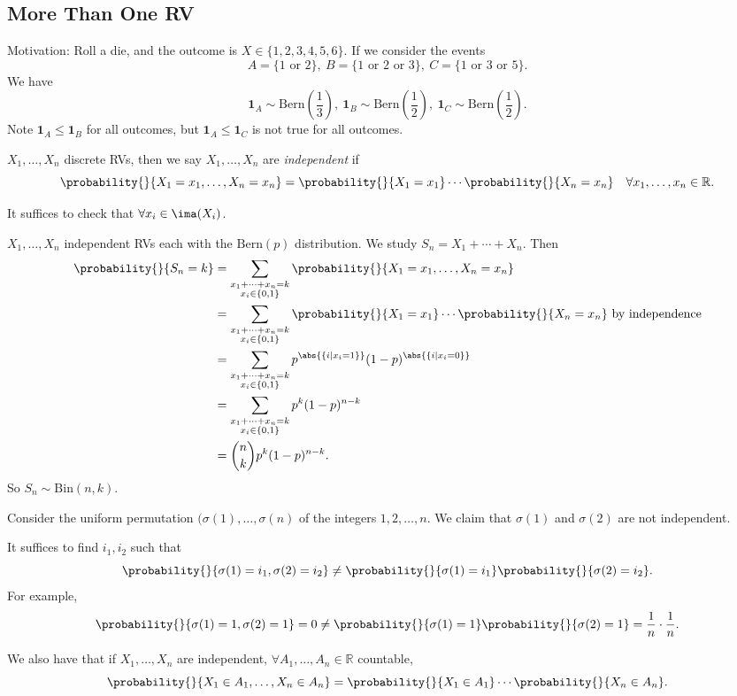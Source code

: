 \subsection{More Than One RV}
Motivation: Roll a die, and the outcome is \(X \in \{1,2,3,4,5,6\}\). If we consider the events
\[
    A = \{1 \text{ or } 2\},~B = \{1 \text{ or } 2 \text{ or } 3\},~C = \{1 \text{ or } 3 \text{ or } 5\}.
\]
We have
\[
    \textbf{1}_A \sim \mathrm{Bern}(\frac{1}{3}),~\textbf{1}_B \sim \mathrm{Bern}(\frac{1}{2}),~\textbf{1}_C \sim \mathrm{Bern}(\frac{1}{2}) .
\]
Note \(\textbf{1}_A \leq \textbf{1}_B\) for all outcomes, but \(\textbf{1}_A \leq \textbf{1}_C\) is not true for all outcomes.
\begin{definition}{}{}
    \(X_1, \ldots, X_n\) discrete RVs, then we say \(X_1, \ldots, X_n\) are \textit{independent} if
    \[
        \probability{}{X_1 = x_1, \ldots, X_n = x_n} = \probability{}{X_1 = x_1} \cdots \probability{}{X_n = x_n}\quad \forall x_1, \ldots, x_n \in \mathbb{R}.
    \]
\end{definition}
\begin{remark}
    It suffices to check that \(\forall x_i \in \ima(X_i)\).
\end{remark}
\begin{example}
    \(X_1, \ldots, X_n\) independent RVs each with the \(\mathrm{Bern}(p)\) distribution. We study \(S_n = X_1 + \cdots + X_n\). Then
    \begin{align*}
        \probability{}{S_n = k} &= \sum_{\substack{x_1 + \cdots + x_n = k\\x_i \in \{0,1\}}} \probability{}{X_1 = x_1, \ldots, X_n = x_n}\\
        &= \sum_{\substack{x_1 + \cdots + x_n = k\\x_i \in \{0,1\}}} \probability{}{X_1 = x_1}\cdots\probability{}{X_n = x_n} \text{ by independence}\\
        &= \sum_{\substack{x_1 + \cdots + x_n = k\\x_i \in \{0,1\}}}p^{\abs{\{i\mid x_i = 1\}}}(1-p)^{\abs{\{i\mid x_i = 0\}}}\\
        &= \sum_{\substack{x_1 + \cdots + x_n = k\\x_i \in \{0,1\}}}p^k(1-p)^{n-k}\\
        &= \binom{n}{k}p^k (1-p)^{n-k}.
    \end{align*}
    So \(S_n \sim \mathrm{Bin}(n, k)\).
\end{example}
\begin{example}
    Consider the uniform permutation \((\sigma(1), \ldots, \sigma(n)\) of the integers \(1, 2, \ldots, n\). We claim that \(\sigma(1)\) and \(\sigma(2)\) are not independent.

    It suffices to find \(i_1, i_2\) such that
    \[
        \probability{}{\sigma(1) = i_1, \sigma(2) = i_2} \neq \probability{}{\sigma(1)=i_1}\probability{}{\sigma(2) = i_2}.
    \]
    For example,
    \[
        \probability{}{\sigma(1) = 1, \sigma(2) = 1} = 0 \neq \probability{}{\sigma(1)=1}\probability{}{\sigma(2) = 1} = \frac{1}{n}\cdot \frac{1}{n}.
    \]
\end{example}
We also have that if \(X_1, \ldots, X_n\) are independent, \(\forall A_1, \ldots, A_n \in \mathbb{R}\) countable,
\[
    \probability{}{X_1 \in A_1, \ldots, X_n \in A_n} = \probability{}{X_1 \in A_1} \cdots \probability{}{X_n \in A_n}.
\]